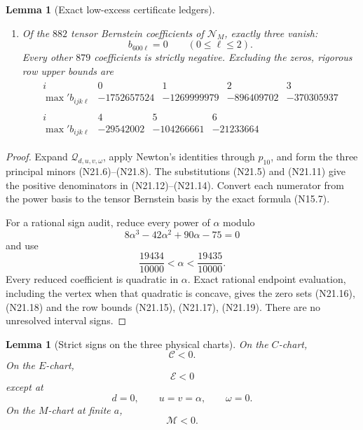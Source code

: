 \documentclass[11pt]{article}
\newtheorem{lemma}[theorem]{Lemma}
\theoremstyle{definition}
\theoremstyle{remark}
\begin{document}
\begin{lemma}[Exact low-excess certificate ledgers]
\begin{enumerate}[label=\textup{(\roman*)}]
\item Of the \(882\) tensor Bernstein coefficients of
\(\mathcal N_M\), exactly three vanish:
\[
 b_{600\ell}=0\qquad(0\leq\ell\leq2).
 \tag{N21.18}
\]
Every other \(879\) coefficients is strictly negative.  Excluding the
zeros, rigorous row upper bounds are
\[
\begin{gathered}
\begin{array}{c|rrrr}
 i&0&1&2&3\\ \hline
 \max{}'b_{ijk\ell}
 &-1752657524&-1269999979&-896409702&-370305937
\end{array}\\[1mm]
\begin{array}{c|rrr}
 i&4&5&6\\ \hline
 \max{}'b_{ijk\ell}
 &-29542002&-104266661&-21233664
\end{array}
\end{gathered}
\tag{N21.19}
\]
\end{enumerate}
\end{lemma}

\begin{proof}
Expand \(\mathcal Q_{d,u,v,\omega}\), apply Newton's identities through
\(p_{10}\), and form the three principal minors
\textup{(N21.6)}--\textup{(N21.8)}.  The substitutions
\textup{(N21.5)} and \textup{(N21.11)} give the positive denominators in
\textup{(N21.12)}--\textup{(N21.14)}.  Convert each numerator from the
power basis to the tensor Bernstein basis by the exact formula
\textup{(N15.7)}.

For a rational sign audit, reduce every power of \(\alpha\) modulo
\[
 8\alpha^3-42\alpha^2+90\alpha-75=0
 \tag{N21.20}
\]
and use
\[
 \frac{19434}{10000}<\alpha<\frac{19435}{10000}.
 \tag{N21.21}
\]
Every reduced coefficient is quadratic in \(\alpha\).  Exact rational
endpoint evaluation, including the vertex when that quadratic is concave,
gives the zero sets \textup{(N21.16)}, \textup{(N21.18)} and the row
bounds \textup{(N21.15)}, \textup{(N21.17)}, \textup{(N21.19)}.
There are no unresolved interval signs.
\end{proof}

\begin{lemma}[Strict signs on the three physical charts]
\label{lem:f2v21-strict}
On the \(C\)-chart,
\[
 \mathcal C<0.
 \tag{N21.22}
\]
On the \(E\)-chart,
\[
 \mathcal E<0
 \tag{N21.23}
\]
except at
\[
 d=0,\qquad u=v=\alpha,\qquad\omega=0.
 \tag{N21.24}
\]
On the \(M\)-chart at finite \(a\),
\[
 \mathcal M<0.
 \tag{N21.25}
\]
\end{lemma}
\end{document}

